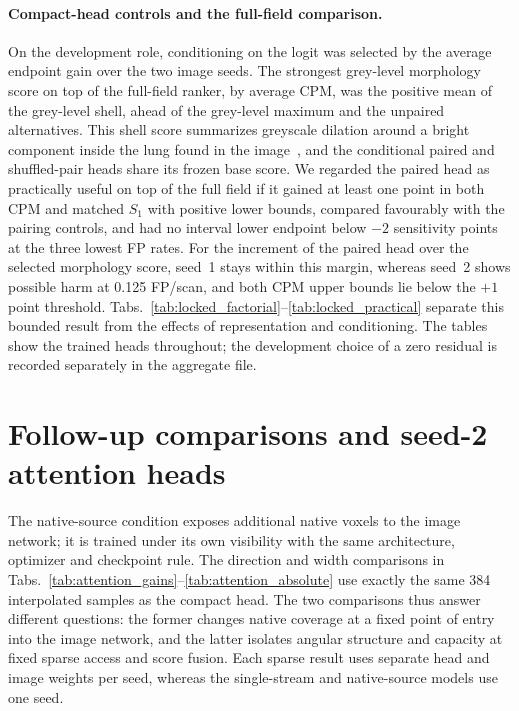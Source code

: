 \paragraph{Compact-head controls and the full-field comparison.}
On the development role, conditioning on the logit was selected by the average endpoint gain over the two image seeds. The strongest grey-level morphology score on top of the full-field ranker, by average CPM, was the positive mean of the grey-level shell, ahead of the grey-level maximum and the unpaired alternatives. This shell score summarizes greyscale dilation around a bright component inside the lung found in the image~\cite{leemput2015shell}, and the conditional paired and shuffled-pair heads share its frozen base score. We regarded the paired head as practically useful on top of the full field if it gained at least one point in both CPM and matched $S_1$ with positive lower bounds, compared favourably with the pairing controls, and had no interval lower endpoint below $-2$ sensitivity points at the three lowest FP rates. For the increment of the paired head over the selected morphology score, seed~1 stays within this margin, whereas seed~2 shows possible harm at 0.125 FP/scan, and both CPM upper bounds lie below the $+1$ point threshold. Tabs.~\ref{tab:locked_factorial}--\ref{tab:locked_practical} separate this bounded result from the effects of representation and conditioning. The tables show the trained heads throughout; the development choice of a zero residual is recorded separately in the aggregate file.

\section{Follow-up comparisons and seed-2 attention heads}
\label{supp:new}

The native-source condition exposes additional native voxels to the image network; it is trained under its own visibility with the same architecture, optimizer and checkpoint rule. The direction and width comparisons in Tabs.~\ref{tab:attention_gains}--\ref{tab:attention_absolute} use exactly the same 384 interpolated samples as the compact head. The two comparisons thus answer different questions: the former changes native coverage at a fixed point of entry into the image network, and the latter isolates angular structure and capacity at fixed sparse access and score fusion. Each sparse result uses separate head and image weights per seed, whereas the single-stream and native-source models use one seed.

